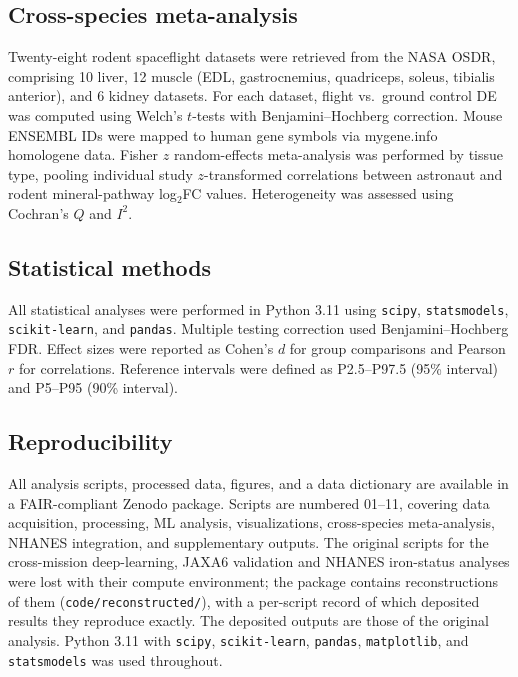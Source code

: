\documentclass[11pt,a4paper]{article}
\begin{document}
\subsection{Cross-species meta-analysis}

Twenty-eight rodent spaceflight datasets were retrieved from the NASA OSDR, comprising 10 liver, 12 muscle (EDL, gastrocnemius, quadriceps, soleus, tibialis anterior), and 6 kidney datasets. For each dataset, flight vs.\ ground control DE was computed using Welch's $t$-tests with Benjamini--Hochberg correction. Mouse ENSEMBL IDs were mapped to human gene symbols via mygene.info homologene data. Fisher $z$ random-effects meta-analysis was performed by tissue type, pooling individual study $z$-transformed correlations between astronaut and rodent mineral-pathway log$_2$FC values. Heterogeneity was assessed using Cochran's $Q$ and $I^2$.

\subsection{Statistical methods}

All statistical analyses were performed in Python 3.11 using \texttt{scipy}, \texttt{statsmodels}, \texttt{scikit-learn}, and \texttt{pandas}. Multiple testing correction used Benjamini--Hochberg FDR. Effect sizes were reported as Cohen's $d$ for group comparisons and Pearson $r$ for correlations. Reference intervals were defined as P2.5--P97.5 (95\% interval) and P5--P95 (90\% interval).

\subsection{Reproducibility}

All analysis scripts, processed data, figures, and a data dictionary are available in a FAIR-compliant Zenodo package. Scripts are numbered 01--11, covering data acquisition, processing, ML analysis, visualizations, cross-species meta-analysis, NHANES integration, and supplementary outputs. The original scripts for the cross-mission deep-learning, JAXA6 validation and NHANES iron-status analyses were lost with their compute environment; the package contains reconstructions of them (\texttt{code/reconstructed/}), with a per-script record of which deposited results they reproduce exactly. The deposited outputs are those of the original analysis. Python 3.11 with \texttt{scipy}, \texttt{scikit-learn}, \texttt{pandas}, \texttt{matplotlib}, and \texttt{statsmodels} was used throughout.
\end{document}

